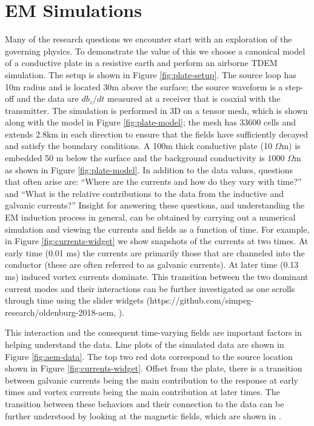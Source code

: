 \documentclass[paper]{geophysics}
\begin{document}
\section{EM Simulations}
Many of the research questions we encounter start with an exploration of the governing physics. To demonstrate the value of this we choose a canonical model of a conductive plate in a resistive earth and perform an airborne TDEM simulation. The setup is shown in Figure \ref{fig:plate-setup}. The source loop has 10m radius and is located 30m above the surface; the source waveform is a step-off and the data are $db_z/dt$ measured at a receiver that is coaxial with the transmitter. The simulation is performed in 3D on a tensor mesh, which is shown along with the model in Figure \ref{fig:plate-model}; the mesh has 33600 cells and extends 2.8km in each direction to ensure that the fields have sufficiently decayed and satisfy the boundary conditions. A 100m thick conductive plate (10 $\Omega$m) is embedded 50 m below the surface and the background conductivity is 1000 $\Omega$m as shown in Figure \ref{fig:plate-model}. In addition to the data values, questions that often arise are: ``Where are the currents and how do they vary with time?'' and ``What is the relative contributions to the data from the inductive and galvanic currents?'' Insight for answering these questions, and understanding the EM induction process in general, can be obtained by carrying out a numerical simulation and viewing the currents and fields as a function of time. For example, in Figure \ref{fig:currents-widget} we show snapshots of the currents at two times. At early time (0.01 ms) the currents are primarily those that are channeled into the conductor (these are often referred to as galvanic currents). At later time (0.13 ms) induced vortex currents dominate. This transition between the two dominant current modes and their interactions can be further investigated as one scrolls through time using the slider widgets (https://github.com/simpeg-research/oldenburg-2018-aem, \cite{kang2018}).












This interaction and the consequent time-varying fields are important factors in helping understand the data. Line plots of the simulated data are shown in Figure \ref{fig:aem-data}. The top two red dots correspond to the source location shown in Figure \ref{fig:currents-widget}. Offset from the plate, there is a transition between galvanic currents being the main contribution to the response at early times and vortex currents being the main contribution at later times. The transition between these behaviors and their connection to the data can be further understood by looking at the magnetic fields, which are shown in \cite{Heagy2018}.
\end{document}
